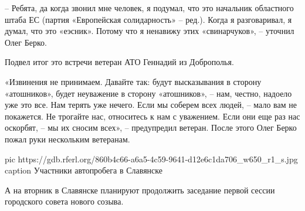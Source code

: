 – Ребята, да когда звонил мне человек, я подумал, что это начальник областного
штаба ЕС (партия «Европейская солидарность» – ред.). Когда я разговаривал, я
думал, что это «еэсник». Потому что я ненавижу этих «свинарчуков», – уточнил
Олег Берко.

Подвел итог это встречи ветеран АТО Геннадий из Доброполья.

«Извинения не принимаем. Давайте так: будут высказывания в сторону «атошников»,
будет неуважение в сторону «атошников», – нам, честно, надоело уже это все. Нам
терять уже нечего. Если мы соберем всех людей, – мало вам не покажется. Не
трогайте нас, относитесь к нам с уважением. Если они еще раз нас оскорбят, – мы
их сносим всех», – предупредил ветеран. После этого Олег Берко пожал руки
нескольким ветеранам.

\ifcmt
  pic https://gdb.rferl.org/860b4c66-a6a5-4c59-9641-d12e6c1da706_w650_r1_s.jpg
  caption Участники автопробега в Славянске
\fi

А на вторник в Славянске планируют продолжить заседание первой сессии
городского совета нового созыва.
